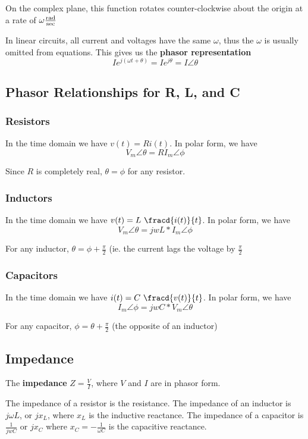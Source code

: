 \documentclass[12pt]{article}
\begin{document}
On the complex plane, this function rotates counter-clockwise about the origin at a rate of $\omega \frac{{\rm rad}}{{\rm sec}}$

In linear circuits, all current and voltages have the same $\omega$, thus the $\omega$ is usually omitted from equations. This gives us the {\bf phasor representation} \[ Ie^{j(\omega t + \theta)} = Ie^{j\theta} = I\angle\theta \]

\subsection*{Phasor Relationships for R, L, and C}
\subsubsection*{Resistors}
In the time domain we have $v(t) = Ri(t)$. In polar form, we have \[ V_m\angle\theta = RI_m\angle\phi \]

Since $R$ is completely real, $\theta = \phi$ for any resistor.

\subsubsection*{Inductors}
In the time domain we have $v(t) = L\ \fracd{i(t)}{t}$. In polar form, we have \[ V_m\angle\theta = jwL * I_m\angle\phi \]

For any inductor, $\theta = \phi + \frac{\pi}{2}$ (ie. the current lags the voltage by $\frac{\pi}{2}$

\subsubsection*{Capacitors}
In the time domain we have $i(t) = C\ \fracd{v(t)}{t}$. In polar form, we have \[ I_m\angle\phi = jwC * V_m\angle\theta \]

For any capacitor, $\phi = \theta + \frac{\pi}{2}$ (the opposite of an inductor)

\subsection*{Impedance}
The {\bf impedance} $Z = \frac{V}{I}$, where $V$ and $I$ are in phasor form.

The impedance of a resistor is the resistance. The impedance of an inductor is $j\omega L$, or $jx_L$, where $x_L$ is the inductive reactance. The impedance of a capacitor is $\frac{1}{jwC}$ or $jx_C$ where $x_C = -\frac{1}{\omega C}$ is the capacitive reactance.
\end{document}
